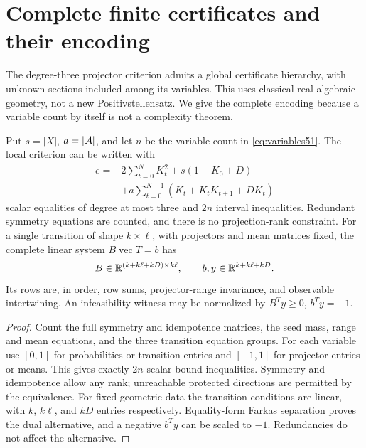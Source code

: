 \section{Complete finite certificates and their encoding}
\label{sec:global52}
The degree-three projector criterion admits a global certificate
hierarchy, with unknown sections included among its variables. This
uses classical real algebraic geometry, not a new Positivstellensatz.
We give the complete encoding because a variable count by itself is
not a complexity theorem.

\begin{proposition}
\label{prop:counts52}
Put $s=|X|$, $a=|\mathcal A|$, and let $n$ be the variable count in
\eqref{eq:variables51}. The local criterion can be written with
\begin{equation}\label{eq:counts52}
 \begin{split}
 e={}&2\sum_{t=0}^N K_t^2+s(1+K_0+D)\\
     &+a\sum_{t=0}^{N-1}(K_t+K_tK_{t+1}+DK_t)
 \end{split}
\end{equation}
scalar equalities of degree at most three and $2n$ interval
inequalities. Redundant symmetry equations are counted, and there
is no projection-rank constraint. For a single transition of shape
$k\times\ell$, with projectors and mean matrices fixed, the complete
linear system $B\operatorname{vec}T=b$ has
\[
 B\in\mathbb R^{(k+k\ell+kD)\times k\ell},\qquad
 b,y\in\mathbb R^{k+k\ell+kD}.
\]
Its rows are, in order, row sums, projector-range invariance, and
observable intertwining. An infeasibility witness may be normalized
by $B^Ty\ge0$, $b^Ty=-1$.
\end{proposition}
\begin{proof}
Count the full symmetry and idempotence matrices, the seed mass,
range and mean equations, and the three transition equation groups.
For each variable use $[0,1]$ for probabilities or transition entries
and $[-1,1]$ for projector entries or means. This gives exactly $2n$
scalar bound inequalities. Symmetry and idempotence allow any rank;
unreachable protected directions are permitted by the equivalence.
For fixed geometric data the transition conditions are linear, with
$k$, $k\ell$, and $kD$ entries respectively. Equality-form Farkas
separation proves the dual alternative, and a negative $b^Ty$ can be
scaled to $-1$. Redundancies do not affect the alternative.
\end{proof}

